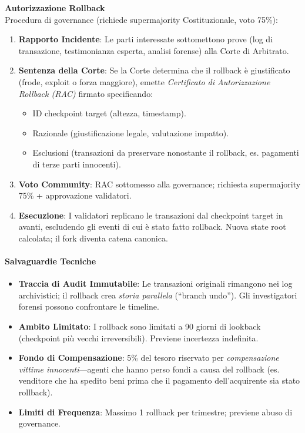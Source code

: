 \documentclass[11pt]{article}
\begin{document}
\textbf{Autorizzazione Rollback}\\
Procedura di governance (richiede supermajority Costituzionale, voto 75\%):
\begin{enumerate}[noitemsep]
  \item \textbf{Rapporto Incidente}: Le parti interessate sottomettono prove (log di transazione, testimonianza esperta, analisi forense) alla Corte di Arbitrato.
  \item \textbf{Sentenza della Corte}: Se la Corte determina che il rollback è giustificato (frode, exploit o forza maggiore), emette \emph{Certificato di Autorizzazione Rollback (RAC)} firmato specificando:
    \begin{itemize}[noitemsep]
      \item ID checkpoint target (altezza, timestamp).
      \item Razionale (giustificazione legale, valutazione impatto).
      \item Esclusioni (transazioni da preservare nonostante il rollback, es. pagamenti di terze parti innocenti).
    \end{itemize}
  \item \textbf{Voto Community}: RAC sottomesso alla governance; richiesta supermajority 75\% + approvazione validatori.
  \item \textbf{Esecuzione}: I validatori replicano le transazioni dal checkpoint target in avanti, escludendo gli eventi di cui è stato fatto rollback. Nuova state root calcolata; il fork diventa catena canonica.
\end{enumerate}

\paragraph{Salvaguardie Tecniche}
\begin{itemize}[noitemsep]
  \item \textbf{Traccia di Audit Immutabile}: Le transazioni originali rimangono nei log archivistici; il rollback crea \emph{storia parallela} (``branch undo''). Gli investigatori forensi possono confrontare le timeline.
  \item \textbf{Ambito Limitato}: I rollback sono limitati a 90 giorni di lookback (checkpoint più vecchi irreversibili). Previene incertezza indefinita.
  \item \textbf{Fondo di Compensazione}: 5\% del tesoro riservato per \emph{compensazione vittime innocenti}—agenti che hanno perso fondi a causa del rollback (es. venditore che ha spedito beni prima che il pagamento dell'acquirente sia stato rollback).
  \item \textbf{Limiti di Frequenza}: Massimo 1 rollback per trimestre; previene abuso di governance.
\end{itemize}
\end{document}
